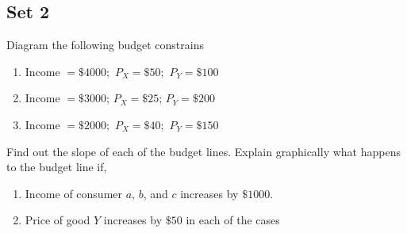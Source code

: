 \documentclass[12pt]{article}
\begin{document}
\subsection{Set 2}
\begin{prob}
	Diagram the following budget constrains
	\begin{enumerate}[label=\alph*.,nolistsep]
		\item Income $=\$4000;$ $P_X=\$50;$ $P_Y=\$100$
		\item Income $ =\$3000;\, P_X=\$25;\, P_Y=\$200 $
		\item Income $=\$2000;$ $P_X=\$40;$ $P_Y=\$150$
	\end{enumerate}
	Find out the slope of each of the budget lines. Explain graphically what happens to the budget line if,
	\begin{enumerate}[label=(\roman*),nolistsep]
		\item Income of consumer $ a $, $ b $, and $ c $ increases by $\$1000$.
		\item Price of good $ Y $ increases by $\$50$ in each of the cases
	\end{enumerate}
\end{prob}
\end{document}
